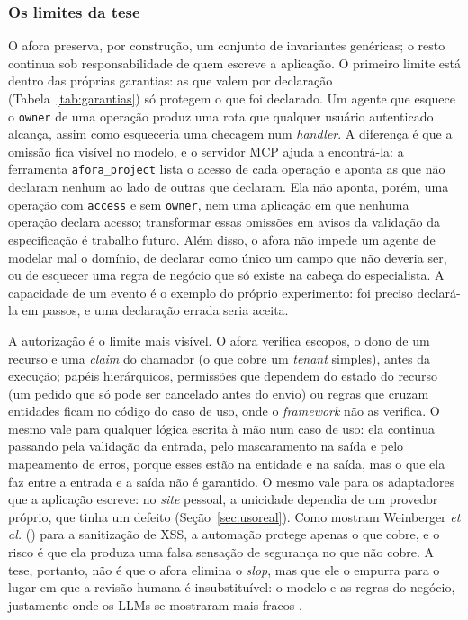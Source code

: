\documentclass[a4paper,12pt]{article}
\newcommand{\estr}[1]{\textit{#1}}
\begin{document}
\subsubsection{Os limites da tese}\label{sec:limites}

O afora preserva, por construção, um conjunto de invariantes genéricas; o resto continua sob responsabilidade de quem escreve a aplicação. O primeiro limite está dentro das próprias garantias: as que valem por declaração (Tabela~\ref{tab:garantias}) só protegem o que foi declarado. Um agente que esquece o \texttt{owner} de uma operação produz uma rota que qualquer usuário autenticado alcança, assim como esqueceria uma checagem num \estr{handler}. A diferença é que a omissão fica visível no modelo, e o servidor MCP ajuda a encontrá-la: a ferramenta \texttt{afora\_project} lista o acesso de cada operação e aponta as que não declaram nenhum ao lado de outras que declaram. Ela não aponta, porém, uma operação com \texttt{access} e sem \texttt{owner}, nem uma aplicação em que nenhuma operação declara acesso; transformar essas omissões em avisos da validação da especificação é trabalho futuro. Além disso, o afora não impede um agente de modelar mal o domínio, de declarar como único um campo que não deveria ser, ou de esquecer uma regra de negócio que só existe na cabeça do especialista. A capacidade de um evento é o exemplo do próprio experimento: foi preciso declará-la em passos, e uma declaração errada seria aceita.

A autorização é o limite mais visível. O afora verifica escopos, o dono de um recurso e uma \estr{claim} do chamador (o que cobre um \estr{tenant} simples), antes da execução; papéis hierárquicos, permissões que dependem do estado do recurso (um pedido que só pode ser cancelado antes do envio) ou regras que cruzam entidades ficam no código do caso de uso, onde o \estr{framework} não as verifica. O mesmo vale para qualquer lógica escrita à mão num caso de uso: ela continua passando pela validação da entrada, pelo mascaramento na saída e pelo mapeamento de erros, porque esses estão na entidade e na saída, mas o que ela faz entre a entrada e a saída não é garantido. O mesmo vale para os adaptadores que a aplicação escreve: no \estr{site} pessoal, a unicidade dependia de um provedor próprio, que tinha um defeito (Seção~\ref{sec:usoreal}). Como mostram Weinberger \textit{et al.} (\citeyear{weinberger2011}) para a sanitização de XSS, a automação protege apenas o que cobre, e o risco é que ela produza uma falsa sensação de segurança no que não cobre. A tese, portanto, não é que o afora elimina o \estr{slop}, mas que ele o empurra para o lugar em que a revisão humana é insubstituível: o modelo e as regras do negócio, justamente onde os LLMs se mostraram mais fracos \citep{camara2023}.
\end{document}
